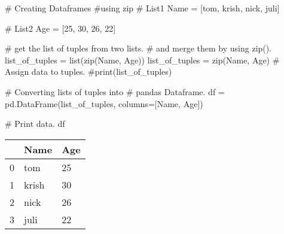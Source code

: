\documentclass[
  letterpaper,
  DIV=11,
  numbers=noendperiod]{scrreprt}
\newenvironment{Shaded}{\begin{snugshade}}{\end{snugshade}}
\newcommand{\BuiltInTok}[1]{\textcolor[rgb]{0.00,0.23,0.31}{#1}}
\newcommand{\CommentTok}[1]{\textcolor[rgb]{0.37,0.37,0.37}{#1}}
\newcommand{\DecValTok}[1]{\textcolor[rgb]{0.68,0.00,0.00}{#1}}
\newcommand{\NormalTok}[1]{\textcolor[rgb]{0.00,0.23,0.31}{#1}}
\newcommand{\OperatorTok}[1]{\textcolor[rgb]{0.37,0.37,0.37}{#1}}
\newcommand{\StringTok}[1]{\textcolor[rgb]{0.13,0.47,0.30}{#1}}
\begin{document}
\begin{Shaded}
\begin{Highlighting}[]
\CommentTok{\# Creating Dataframes}
\CommentTok{\#using zip}
\CommentTok{\# List1}
\NormalTok{Name }\OperatorTok{=}\NormalTok{ [}\StringTok{\textquotesingle{}tom\textquotesingle{}}\NormalTok{, }\StringTok{\textquotesingle{}krish\textquotesingle{}}\NormalTok{, }\StringTok{\textquotesingle{}nick\textquotesingle{}}\NormalTok{, }\StringTok{\textquotesingle{}juli\textquotesingle{}}\NormalTok{]}
  
\CommentTok{\# List2}
\NormalTok{Age }\OperatorTok{=}\NormalTok{ [}\DecValTok{25}\NormalTok{, }\DecValTok{30}\NormalTok{, }\DecValTok{26}\NormalTok{, }\DecValTok{22}\NormalTok{]}
  
\CommentTok{\# get the list of tuples from two lists.}
\CommentTok{\# and merge them by using zip().}
\NormalTok{list\_of\_tuples }\OperatorTok{=} \BuiltInTok{list}\NormalTok{(}\BuiltInTok{zip}\NormalTok{(Name, Age))}
\NormalTok{list\_of\_tuples }\OperatorTok{=} \BuiltInTok{zip}\NormalTok{(Name, Age)}
\CommentTok{\# Assign data to tuples.}
\CommentTok{\#print(list\_of\_tuples)}
  
  
\CommentTok{\# Converting lists of tuples into}
\CommentTok{\# pandas Dataframe.}
\NormalTok{df }\OperatorTok{=}\NormalTok{ pd.DataFrame(list\_of\_tuples,}
\NormalTok{                  columns}\OperatorTok{=}\NormalTok{[}\StringTok{\textquotesingle{}Name\textquotesingle{}}\NormalTok{, }\StringTok{\textquotesingle{}Age\textquotesingle{}}\NormalTok{])}
  
\CommentTok{\# Print data.}
\NormalTok{df}
\end{Highlighting}
\end{Shaded}

\begin{longtable}[]{@{}lll@{}}
\toprule()
& Name & Age \\
\midrule()
\endhead
0 & tom & 25 \\
1 & krish & 30 \\
2 & nick & 26 \\
3 & juli & 22 \\
\bottomrule()
\end{longtable}
\end{document}
